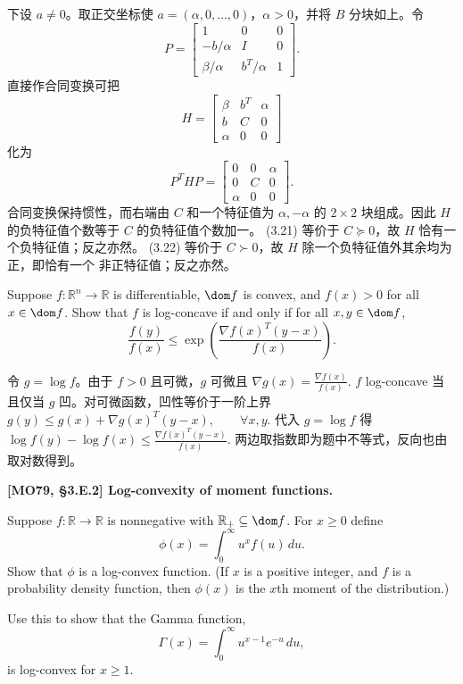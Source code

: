\documentclass{ctexart}
\begin{document}
\begin{solution}
\begin{enumerate}
      下设 $a\neq0$。取正交坐标使 $a=(\alpha,0,\ldots,0)$，$\alpha>0$，并将
      $B$ 分块如上。令
      \[
        P=
        \begin{bmatrix}
          1&0&0\\
          -b/\alpha& I&0\\
          \beta/\alpha& b^T/\alpha&1
        \end{bmatrix}.
      \]
      直接作合同变换可把
      \[
        H=
        \begin{bmatrix}
          \beta&b^T&\alpha\\
          b&C&0\\
          \alpha&0&0
        \end{bmatrix}
      \]
      化为
      \[
        P^THP=
        \begin{bmatrix}
          0&0&\alpha\\
          0&C&0\\
          \alpha&0&0
        \end{bmatrix}.
      \]
      合同变换保持惯性，而右端由 $C$ 和一个特征值为 $\alpha,-\alpha$ 的
      $2\times2$ 块组成。因此 $H$ 的负特征值个数等于 $C$ 的负特征值个数加一。
      (3.21) 等价于 $C\succeq0$，故 $H$ 恰有一个负特征值；反之亦然。
      (3.22) 等价于 $C\succ0$，故 $H$ 除一个负特征值外其余均为正，即恰有一个
      非正特征值；反之亦然。
  \end{enumerate}
\end{solution}

\begin{problem}\label{3.47}
  Suppose $f:\mathbb{R}^n\to\mathbb{R}$ is differentiable, $\dom f$ is convex, and
  $f(x)>0$ for all $x\in\dom f$. Show that $f$ is log-concave if and only
  if for all $x,y\in\dom f$,
  \[
    \frac{f(y)}{f(x)}\leq
    \exp\!\left(\frac{\nabla f(x)^T(y-x)}{f(x)}\right).
  \]
\end{problem}

\begin{solution}
  令 $g=\log f$。由于 $f>0$ 且可微，$g$ 可微且
  \(
    \nabla g(x)=\frac{\nabla f(x)}{f(x)}.
  \)
  $f$ log-concave 当且仅当 $g$ 凹。对可微函数，凹性等价于一阶上界
  \(
    g(y)\leq g(x)+\nabla g(x)^T(y-x),\qquad \forall x,y.
  \)
  代入 $g=\log f$ 得
  \(
    \log f(y)-\log f(x)\leq \frac{\nabla f(x)^T(y-x)}{f(x)}.
  \)
  两边取指数即为题中不等式，反向也由取对数得到。
\end{solution}

\begin{problem}\label{3.52}
  \textbf{[MO79, \S3.E.2] Log-convexity of moment functions.}

  Suppose $f:\mathbb{R}\to\mathbb{R}$ is nonnegative with $\mathbb{R}_+\subseteq\dom f$.
  For $x\geq0$ define
  \[
    \phi(x)=\int_0^\infty u^x f(u)\,du.
  \]
  Show that $\phi$ is a log-convex function. (If $x$ is a positive integer,
    and $f$ is a probability density function, then $\phi(x)$ is the $x$th moment
  of the distribution.)

  Use this to show that the Gamma function,
  \[
    \Gamma(x)=\int_0^\infty u^{x-1}e^{-u}\,du,
  \]
  is log-convex for $x\geq1$.
\end{problem}
\end{document}
